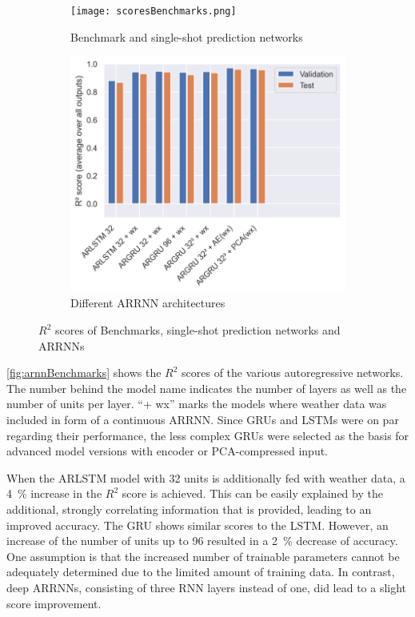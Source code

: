 \documentclass[11pt,table]{article}
\begin{document}
\begin{figure}[ht]
\centering
\begin{subfigure}{.5\textwidth}
    \centering
	\texttt{[image: scoresBenchmarks.png]} \vspace*{0.5cm}
	\caption{Benchmark and single-shot prediction networks}
	\label{fig:benchmarks}
\end{subfigure}%
\begin{subfigure}{.5\textwidth}
	\centering
	\includegraphics[scale=1.0]{figures/arnnCompare.png}
	\caption{Different \ac{ARRNN} architectures}
	\label{fig:arnnBenchmarks}
\end{subfigure}
\caption{$R^2$ scores of Benchmarks, single-shot prediction networks and \acp{ARRNN}}
\label{fig:ResultBarChart}
\end{figure}



\autoref{fig:arnnBenchmarks} shows the $R^2$ scores of the various autoregressive networks. The number behind the model name indicates the number of layers as well as the number of units per layer. 
\enquote{+ wx} marks the models where weather data was included in form of a continuous \ac{ARRNN}. 
Since \acp{GRU} and \acp{LSTM} were on par regarding their performance, the less complex \acp{GRU} were selected as the basis for advanced model versions with encoder or \ac{PCA}-compressed input.

When the ARLSTM model with 32 units is additionally fed with weather data, a \qty{4}{\percent} increase in the $R^2$ score is achieved. This can be easily explained by the additional, strongly correlating information that is provided, leading to an improved accuracy. The \ac{GRU} shows similar scores to the \ac{LSTM}. However, an increase of the number of units up to 96 resulted in a \qty{2}{\percent} decrease of accuracy. One assumption is that the increased number of trainable parameters cannot be adequately determined due to the limited amount of training data. In contrast, deep \acp{ARRNN}, consisting of three \ac{RNN} layers instead of one, did lead to a slight score improvement.
\end{document}
